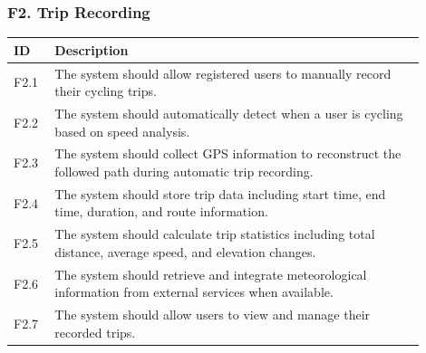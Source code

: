 \subsubsection{F2. Trip Recording}
\begin{center}
    \begin{longtable}{ |l|p{0.9\linewidth}| }
        \hline
        \textbf{ID} & \textbf{Description} \\
        \hline
        F2.1 & The system should allow registered users to manually record their cycling trips. \\
        \hline
        F2.2 & The system should automatically detect when a user is cycling based on speed analysis. \\
        \hline
        F2.3 & The system should collect GPS information to reconstruct the followed path during automatic trip recording. \\
        \hline
        F2.4 & The system should store trip data including start time, end time, duration, and route information. \\
        \hline
        F2.5 & The system should calculate trip statistics including total distance, average speed, and elevation changes. \\
        \hline
        F2.6 & The system should retrieve and integrate meteorological information from external services when available. \\
        \hline
        F2.7 & The system should allow users to view and manage their recorded trips. \\
        \hline
    \end{longtable}
\end{center}

